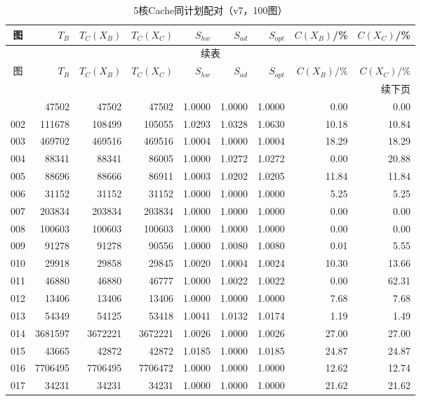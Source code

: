 \begin{longtable}{crrrrrrrr}
\caption{5核Cache同计划配对（v7，100图）}\label{tab:cache-detail-5}\\
\toprule
图 & $T_B$ & $T_C(X_B)$ & $T_C(X_C)$ & $S_{hw}$ & $S_{ad}$ & $S_{opt}$ & $C(X_B)$/\% & $C(X_C)$/\% \\
\midrule
\endfirsthead
\multicolumn{9}{c}{续表}\\
\toprule
图 & $T_B$ & $T_C(X_B)$ & $T_C(X_C)$ & $S_{hw}$ & $S_{ad}$ & $S_{opt}$ & $C(X_B)$/\% & $C(X_C)$/\% \\
\midrule
\endhead
\midrule\multicolumn{9}{r}{续下页}\\
\endfoot
\bottomrule
\endlastfoot
001 & 47502 & 47502 & 47502 & 1.0000 & 1.0000 & 1.0000 & 0.00 & 0.00 \\
002 & 111678 & 108499 & 105055 & 1.0293 & 1.0328 & 1.0630 & 10.18 & 10.84 \\
003 & 469702 & 469516 & 469516 & 1.0004 & 1.0000 & 1.0004 & 18.29 & 18.29 \\
004 & 88341 & 88341 & 86005 & 1.0000 & 1.0272 & 1.0272 & 0.00 & 20.88 \\
005 & 88696 & 88666 & 86911 & 1.0003 & 1.0202 & 1.0205 & 11.84 & 11.84 \\
006 & 31152 & 31152 & 31152 & 1.0000 & 1.0000 & 1.0000 & 5.25 & 5.25 \\
007 & 203834 & 203834 & 203834 & 1.0000 & 1.0000 & 1.0000 & 0.00 & 0.00 \\
008 & 100603 & 100603 & 100603 & 1.0000 & 1.0000 & 1.0000 & 0.00 & 0.00 \\
009 & 91278 & 91278 & 90556 & 1.0000 & 1.0080 & 1.0080 & 0.01 & 5.55 \\
010 & 29918 & 29858 & 29845 & 1.0020 & 1.0004 & 1.0024 & 10.30 & 13.66 \\
011 & 46880 & 46880 & 46777 & 1.0000 & 1.0022 & 1.0022 & 0.00 & 62.31 \\
012 & 13406 & 13406 & 13406 & 1.0000 & 1.0000 & 1.0000 & 7.68 & 7.68 \\
013 & 54349 & 54125 & 53418 & 1.0041 & 1.0132 & 1.0174 & 1.19 & 1.49 \\
014 & 3681597 & 3672221 & 3672221 & 1.0026 & 1.0000 & 1.0026 & 27.00 & 27.00 \\
015 & 43665 & 42872 & 42872 & 1.0185 & 1.0000 & 1.0185 & 24.87 & 24.87 \\
016 & 7706495 & 7706495 & 7706472 & 1.0000 & 1.0000 & 1.0000 & 12.62 & 12.74 \\
017 & 34231 & 34231 & 34231 & 1.0000 & 1.0000 & 1.0000 & 21.62 & 21.62 \\

\end{longtable}
